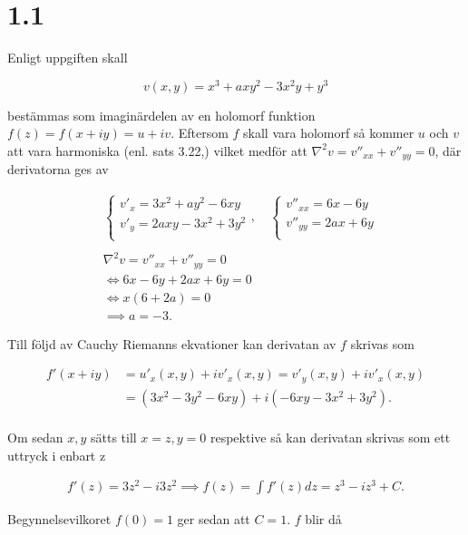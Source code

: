 \documentclass[a4paper]{article}
\begin{document}
\section*{1.1}

Enligt uppgiften skall

\begin{equation*}
	v(x,y) = x^3 + axy^2 - 3x^2y + y^3
\end{equation*}

bestämmas som imaginärdelen av en holomorf funktion $f(z) = f(x + iy) = u + iv$. Eftersom $f$ skall vara holomorf så kommer $u$ och $v$ att vara harmoniska (enl. sats 3.22\cite{boken},) vilket medför att $\nabla^2v = v''_{xx} + v''_{yy} = 0$, där derivatorna ges av

\begin{align*}
	&\begin{cases}
		v'_x = 3x^2 + ay^2 - 6xy\\
		v'_y = 2axy - 3x^2 + 3y^2\\
	\end{cases}
	,\quad
	\begin{cases}
		v''_{xx} = 6x - 6y\\
		v''_{yy} = 2ax + 6y\\
	\end{cases}\\
	&\\
	&\nabla^2v = v''_{xx} + v''_{yy} = 0\\
	&\iff 6x - 6y + 2ax + 6y = 0\\
	&\iff x(6+2a) = 0\\
	&\implies a = -3.
\end{align*}

Till följd av Cauchy Riemanns ekvationer kan derivatan av $f$ skrivas som 

\begin{align*}
	f'(x + iy)	&= u'_x(x,y) + iv'_x(x,y) = v'_y(x,y) + iv'_x(x,y)\\
				&= (3x^2 - 3y^2 - 6xy) + i(-6xy - 3x^2 + 3y^2).\\
\end{align*}

Om sedan $x,y$ sätts till $x = z, y = 0$ respektive så kan derivatan skrivas som ett uttryck i enbart z

\begin{align*}
	f'(z) = 3z^2 - i3z^2
	\implies f(z) = \int f'(z)dz = z^3 - iz^3 + C.
\end{align*}

Begynnelsevilkoret $f(0) = 1$ ger sedan att $C = 1$. $f$ blir då
\end{document}
